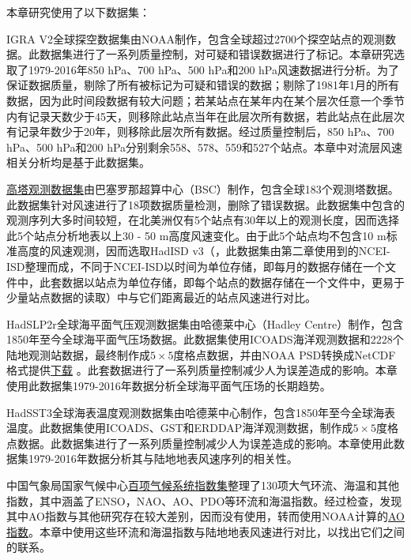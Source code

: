 本章研究使用了以下数据集：

IGRA V2全球探空数据集\citep{durre2006overview}由NOAA制作，包含全球超过2700个探空站点的观测数据。此数据集进行了一系列质量控制，对可疑和错误数据进行了标记。本章研究选取了1979-2016年850 hPa、700 hPa、500 hPa和200 hPa风速数据进行分析。为了保证数据质量，剔除了所有被标记为可疑和错误的数据；剔除了1981年1月的所有数据，因为此时间段数据有较大问题\citep{vautard2010northern}；若某站点在某年内在某个层次任意一个季节内有记录天数少于45天，则移除此站点当年在此层次所有数据，若此站点在此层次有记录年数少于20年，则移除此层次所有数据。经过质量控制后，850 hPa、700 hPa、500 hPa和200 hPa分别剩余558、578、559和527个站点。本章中对流层风速相关分析均是基于此数据集。

\href{https://b2share.eudat.eu/records/159158152f4d4be79559e2f3f6b1a410}{高塔观测数据集}由巴塞罗那超算中心（BSC）制作，包含全球183个观测塔数据。此数据集针对风速进行了18项数据质量检测，删除了错误数据。此数据集中包含的观测序列大多时间较短，在北美洲仅有5个站点有30年以上的观测长度，因而选择此5个站点分析地表以上30 - 50 m高度风速变化。由于此5个站点均不包含10 m标准高度的风速观测，因而选取HadISD v3（\citet{dunn2012hadisd:}，此数据集由第二章使用到的NCEI-ISD整理而成，不同于NCEI-ISD以时间为单位存储，即每月的数据存储在一个文件中，此套数据以站点为单位存储，即每个站点的数据存储在一个文件中，更易于少量站点数据的读取）中与它们距离最近的站点风速进行对比。

HadSLP2r全球海平面气压观测数据集\citep{allan2006a}由哈德莱中心（Hadley Centre）制作，包含1850年至今全球海平面气压场数据。此数据集使用ICOADS海洋观测数据和2228个陆地观测站数据，最终制作成$5 \times 5$度格点数据，并由NOAA PSD转换成NetCDF格式提供\href{https://www.esrl.noaa.gov/psd/gcos_wgsp/Gridded/data.hadslp2.html}{下载} 。此套数据进行了一系列质量控制减少人为误差造成的影响。本章使用此数据集1979-2016年数据分析全球海平面气压场的长期趋势。

HadSST3全球海表温度观测数据集\citep{kennedy2011reassessing1,kennedy2011reassessing2}由哈德莱中心制作，包含1850年至今全球海表温度。此数据集使用ICOADS、GST和ERDDAP海洋观测数据，制作成$5 \times 5$度格点数据。此数据集进行了一系列质量控制减少人为误差造成的影响。本章使用此数据集1979-2016年数据分析其与陆地地表风速序列的相关性。

中国气象局国家气候中心\href{https://cmdp.ncc-cma.net/Monitoring/cn_index_130.php}{百项气候系统指数集}整理了130项大气环流、海温和其他指数，其中涵盖了ENSO，NAO、AO、PDO等环流和海温指数。经过检查，发现其中AO指数与其他研究存在较大差别，因而没有使用，转而使用NOAA计算的\href{https://www.ncdc.noaa.gov/teleconnections/ao/}{AO指数}。本章中使用这些环流和海温指数与陆地地表风速进行对比，以找出它们之间的联系。

